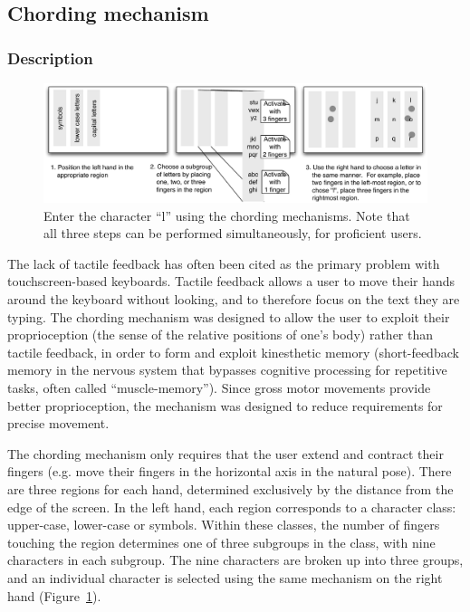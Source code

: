 \subsection{Chording mechanism}
\subsubsection{Description}

\begin{figure}
    \includegraphics[width=\textwidth]{Figures/chording_explaination.pdf} 
    \caption{Enter the character ``l'' using the chording mechanisms.
      Note that all three steps can be performed simultaneously, for
      proficient users.}
    \label{fig:chording_explanation}
\end{figure} 

The lack of tactile feedback has often been cited as the primary problem with touchscreen-based keyboards.  Tactile feedback allows a user to move their hands around the keyboard without looking, and to therefore focus on the text they are typing.  The chording mechanism was designed to allow the user to exploit their proprioception (the sense of the relative positions of one's body) rather than tactile feedback, in order to form and exploit kinesthetic memory (short-feedback memory in the nervous system that bypasses cognitive
processing for repetitive tasks, often called ``muscle-memory''). Since gross motor movements provide better proprioception, the mechanism was designed to reduce requirements for precise movement.

The chording mechanism only requires that the user extend and contract their fingers (e.g. move their fingers in the horizontal axis in the natural pose).  There are three regions for each hand, determined exclusively by the distance from the edge of the screen.  In the left hand, each region corresponds to a character class: upper-case, lower-case or symbols.  Within these classes, the number of fingers touching the region determines one of three subgroups in the class, with nine characters in each subgroup.  The nine characters are broken up into three groups, and an individual character is selected using the same mechanism on the right hand
(Figure~\ref{fig:chording_explanation}).

